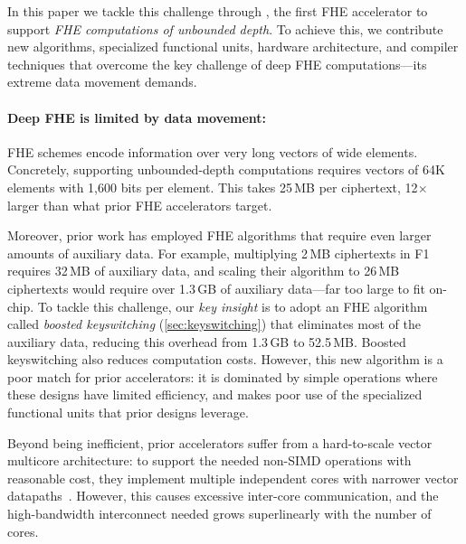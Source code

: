 In this paper we tackle this challenge through \name, the first FHE accelerator
to support \emph{FHE computations of unbounded depth}. To achieve this, we
contribute new algorithms, specialized functional units, hardware architecture,
and compiler techniques that overcome the key challenge of deep FHE
computations---its extreme data movement demands.

\paragraph{Deep FHE is limited by data movement:}
FHE schemes encode information over very long vectors of wide elements.
Concretely, supporting unbounded-depth computations requires vectors of 64K
elements with 1,600 bits per element. This takes 25\,MB per ciphertext,
12$\times$ larger than what prior FHE accelerators target.

Moreover, prior work has employed FHE algorithms that require even larger
amounts of auxiliary data. For example, multiplying 2\,MB ciphertexts in
F1~\cite{feldmann:micro21:f1} requires 32\,MB of auxiliary data, and scaling
their algorithm to 26\,MB ciphertexts would require over 1.3\,GB of auxiliary
data---far too large to fit on-chip. To tackle this challenge, our \emph{key
insight} is to adopt an FHE algorithm called \emph{boosted keyswitching}
(\autoref{sec:keyswitching}) that eliminates most of the auxiliary data,
reducing this overhead from 1.3\,GB to 52.5\,MB. Boosted keyswitching also
reduces computation costs. However, this new algorithm is a poor match for
prior accelerators: it is dominated by simple operations where these designs
have limited efficiency, and makes poor use of the specialized functional units
that prior designs leverage.

Beyond being inefficient, prior accelerators suffer from a hard-to-scale vector
multicore architecture: to support the needed non-SIMD operations with
reasonable cost, they implement multiple independent cores with narrower vector
datapaths~\cite{feldmann:micro21:f1}. However, this causes excessive inter-core
communication, and the high-bandwidth interconnect needed grows superlinearly
with the number of cores.


